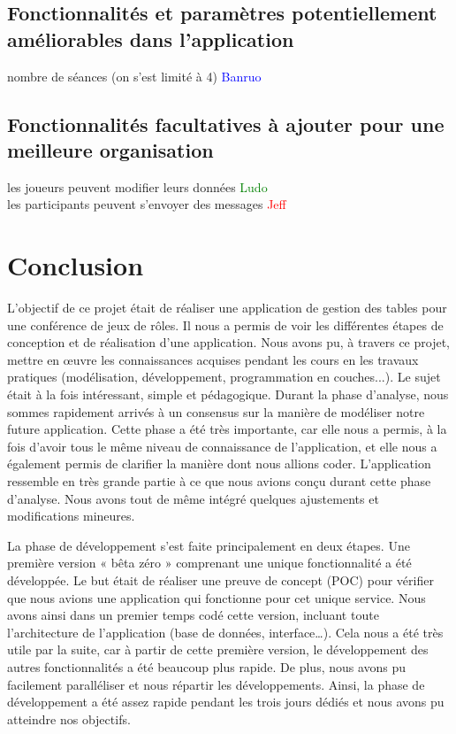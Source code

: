 \documentclass[11pt]{article}
\begin{document}
\subsection{Fonctionnalités et paramètres potentiellement améliorables dans l'application}
nombre de séances (on s'est limité à 4)
\textcolor{blue}{Banruo}


\subsection{Fonctionnalités facultatives à ajouter pour une meilleure organisation}
les joueurs peuvent modifier leurs données 
\textcolor{green}{Ludo}\\
les participants peuvent s'envoyer des messages \textcolor{red}{Jeff}




\newpage
\section*{Conclusion}

L'objectif de ce projet était de réaliser une application de gestion des tables pour une conférence de jeux de rôles. Il nous a permis de voir les différentes étapes de conception et de réalisation d'une application. Nous avons pu, à travers ce projet, mettre en œuvre les connaissances acquises pendant les cours en les travaux pratiques (modélisation, développement, programmation en couches...). Le sujet était à la fois intéressant, simple et pédagogique. Durant la phase d'analyse, nous sommes rapidement arrivés à un consensus sur la manière de modéliser notre future application. Cette phase a été très importante, car elle nous a permis, à la fois d'avoir tous le même niveau de connaissance de l'application, et elle nous a également permis de clarifier la manière dont nous allions coder. L’application ressemble en très grande partie à ce que nous avions conçu durant cette phase d’analyse. Nous avons tout de même intégré quelques ajustements et modifications mineures.

\bigbreak

La phase de développement s’est faite principalement en deux étapes. Une première version « bêta zéro » comprenant une unique fonctionnalité a été développée. Le but était de réaliser une preuve de concept (POC) pour vérifier que nous avions une application qui fonctionne pour cet unique service. Nous avons ainsi dans un premier temps codé cette version, incluant toute l’architecture de l’application (base de données, interface…). Cela nous a été très utile par la suite, car à partir de cette première version, le développement des autres fonctionnalités a été beaucoup plus rapide. De plus, nous avons pu facilement paralléliser et nous répartir les développements. Ainsi, la phase de développement a été assez rapide pendant les trois jours dédiés et nous avons pu atteindre nos objectifs.
\end{document}
